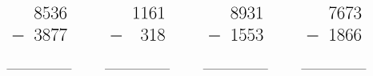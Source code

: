 \documentclass[14pt,a4paper,sans, final]{article}
\begin{document}
\[
\huge 
\begin{array}{cccc}
\begin{array}{lr}
 & 8536 \\
- & 3877 \\
&\\
\hline
&\qquad 
\end{array}\qquad

\begin{array}{lr}
 & 1161 \\
- & 318 \\
&\\
\hline
&\qquad 
\end{array}\qquad

\begin{array}{lr}
 & 8931 \\
- & 1553 \\
&\\
\hline
&\qquad 
\end{array}\qquad

\begin{array}{lr}
 & 7673 \\
- & 1866 \\
&\\
\hline
&\qquad 
\end{array}\qquad

\end{array}
\]
\end{document}
